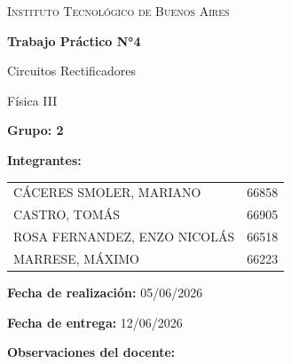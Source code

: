 \begin{titlepage}
    \centering

    \vspace{3cm}

    {\scshape\LARGE Instituto Tecnológico de Buenos Aires \par}
    \vspace{2cm}

    {\Huge\bfseries Trabajo Práctico N°4 \par}
    \vspace{0.5cm}
    {\Large Circuitos Rectificadores \par}
    \vspace{0.5cm}
    {\large Física III \par}

    \vspace{4cm}

    \begin{flushleft}
    {\Large\textbf{Grupo: 2}\par}
    \vspace{0.5cm}

    {\Large\textbf{Integrantes:}\par}
    \vspace{0.3cm}
    \begin{tabular}{l r}
        CÁCERES SMOLER, MARIANO      & 66858 \\
        CASTRO, TOMÁS                & 66905 \\
        ROSA FERNANDEZ, ENZO NICOLÁS & 66518 \\
        MARRESE, MÁXIMO              & 66223 \\
    \end{tabular}
    \end{flushleft}

    \vfill

    \begin{flushleft}
    {\large \textbf{Fecha de realización:} 05/06/2026\par}
    {\large \textbf{Fecha de entrega:} 12/06/2026\par}
    \end{flushleft}

    \vspace{0.6cm}

    \begin{flushleft}
    {\large\textbf{Observaciones del docente:}}\par
    \vspace{0.2cm}
    \framebox[\linewidth]{\rule{0pt}{3cm}}


\end{flushleft}
\end{titlepage}
